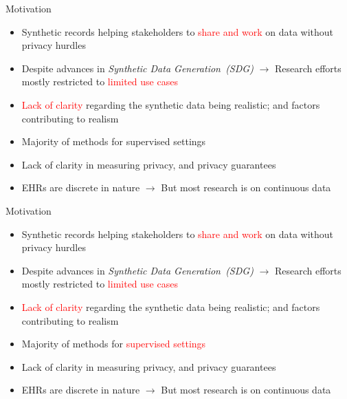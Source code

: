 \documentclass{beamer}
\begin{document}
\begin{frame}{Motivation}
\addtocounter{framenumber}{-1}

\begin{itemize}
  \item Synthetic records helping stakeholders to \textcolor{red}{share and work} on data without privacy hurdles
  \item Despite advances in \textit{Synthetic Data Generation~(SDG)} $\rightarrow$ Research efforts mostly restricted to \textcolor{red}{limited use cases}
  \item \textcolor{red}{Lack of clarity} regarding the synthetic data being realistic; and factors contributing to realism
  \item \textcolor{mygray}{Majority of methods for supervised settings}
  \item \textcolor{mygray}{Lack of clarity in measuring privacy, and privacy guarantees}
  \item \textcolor{mygray}{EHRs are discrete in nature $\rightarrow$ But most research is on continuous data}
  
  
  
\end{itemize}

\end{frame}




\begin{frame}{Motivation}
\addtocounter{framenumber}{-1}

\begin{itemize}
  \item Synthetic records helping stakeholders to \textcolor{red}{share and work} on data without privacy hurdles
  \item Despite advances in \textit{Synthetic Data Generation~(SDG)} $\rightarrow$ Research efforts mostly restricted to \textcolor{red}{limited use cases}
  \item \textcolor{red}{Lack of clarity} regarding the synthetic data being realistic; and factors contributing to realism
  \item Majority of methods for \textcolor{red}{supervised settings}
  \item \textcolor{mygray}{Lack of clarity in measuring privacy, and privacy guarantees}
  \item \textcolor{mygray}{EHRs are discrete in nature $\rightarrow$ But most research is on continuous data}
  
  
  
\end{itemize}

\end{frame}
\end{document}
